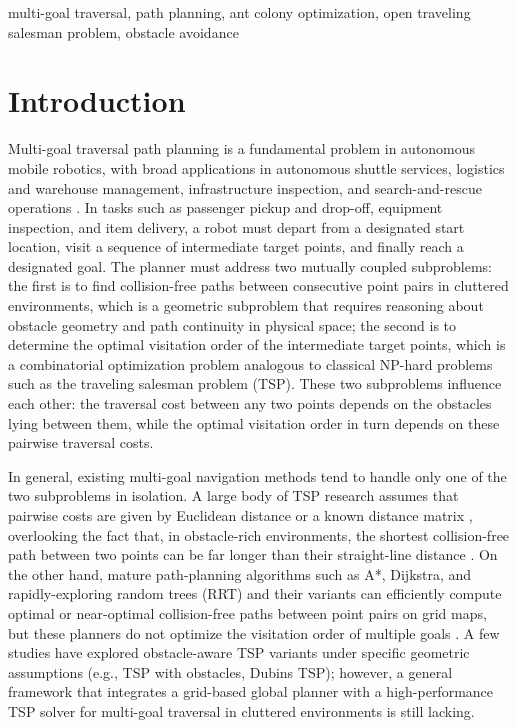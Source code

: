 \begin{IEEEkeywords}

multi-goal traversal, path planning, ant colony optimization, open traveling salesman problem, obstacle avoidance

\end{IEEEkeywords}

\section{Introduction}

Multi-goal traversal path planning is a fundamental problem in autonomous mobile robotics, with broad applications in autonomous shuttle services, logistics and warehouse management, infrastructure inspection, and search-and-rescue operations \textcolor{blue}{\cite{ref1,ref2,ref33,ref37,ref38}}. In tasks such as passenger pickup and drop-off, equipment inspection, and item delivery, a robot must depart from a designated start location, visit a sequence of intermediate target points, and finally reach a designated goal. The planner must address two mutually coupled subproblems: the first is to find collision-free paths between consecutive point pairs in cluttered environments, which is a geometric subproblem that requires reasoning about obstacle geometry and path continuity in physical space; the second is to determine the optimal visitation order of the intermediate target points, which is a combinatorial optimization problem analogous to classical NP-hard problems such as the traveling salesman problem (TSP). These two subproblems influence each other: the traversal cost between any two points depends on the obstacles lying between them, while the optimal visitation order in turn depends on these pairwise traversal costs.

In general, existing multi-goal navigation methods tend to handle only one of the two subproblems in isolation. A large body of TSP research assumes that pairwise costs are given by Euclidean distance or a known distance matrix \textcolor{blue}{\cite{ref4,ref36}}, overlooking the fact that, in obstacle-rich environments, the shortest collision-free path between two points can be far longer than their straight-line distance \textcolor{blue}{\cite{ref39}}. On the other hand, mature path-planning algorithms such as A*, Dijkstra, and rapidly-exploring random trees (RRT) and their variants can efficiently compute optimal or near-optimal collision-free paths between point pairs on grid maps, but these planners do not optimize the visitation order of multiple goals \textcolor{blue}{\cite{ref5,ref6,ref7}}. A few studies have explored obstacle-aware TSP variants under specific geometric assumptions (e.g., TSP with obstacles, Dubins TSP); however, a general framework that integrates a grid-based global planner with a high-performance TSP solver for multi-goal traversal in cluttered environments is still lacking.

